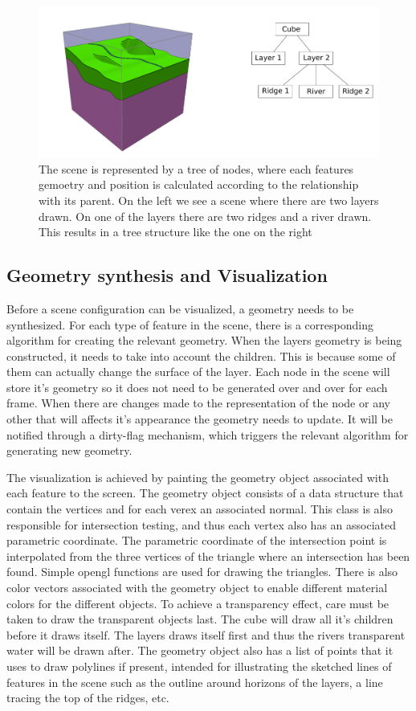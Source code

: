\documentclass[a4paper,12pt]{report}
\begin{document}
\begin{figure}
 \includegraphics[width=\linewidth]{thesis/tree.pdf}
 \caption{The scene is represented by a tree of nodes, where each features gemoetry and position is calculated according to the relationship with its parent. On the left we see a scene where there are two layers drawn. On one of the layers there are two ridges and a river drawn. This results in a tree structure like the one on the right}
 \label{fig:tree}
\end{figure}


\subsection{Geometry synthesis and Visualization}
Before a scene configuration can be visualized, a geometry needs to be synthesized. For each type of feature in the scene, there is a corresponding algorithm for creating the relevant geometry. When the layers geometry is being constructed, it needs to take into account the children. This is because some of them can actually change the surface of the layer. Each node in the scene will store it's geometry so it does not need to be generated over and over for each frame. When there are changes made to the representation of the node or any other that will affects it's appearance the geometry needs to update. It will be notified through a dirty-flag mechanism, which triggers the relevant algorithm for generating new geometry.

The visualization is achieved by painting the geometry object associated with each feature to the screen. The geometry object consists of a data structure that contain the vertices and for each verex an associated normal. This class is also responsible for intersection testing, and thus each vertex also has an associated parametric coordinate. The parametric coordinate of the intersection point is interpolated from the three vertices of the triangle where an intersection has been found. Simple opengl functions are used for drawing the triangles. There is also color vectors associated with the geometry object to enable different material colors for the different objects. To achieve a transparency effect, care must be taken to draw the transparent objects last. The cube will draw all it's children before it draws itself. The layers draws itself first and thus the rivers transparent water will be drawn after. The geometry object also has a list of points that it uses to draw polylines if present, intended for 
illustrating the sketched lines of features in the scene such as the outline around horizons of the layers, a line tracing the top of the ridges, etc.
\end{document}
